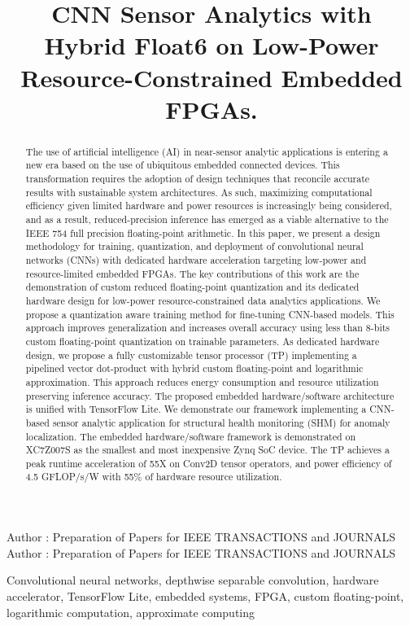 \title {CNN Sensor Analytics with Hybrid Float6 on Low-Power Resource-Constrained Embedded FPGAs.}



\markboth
{Author \headeretal: Preparation of Papers for IEEE TRANSACTIONS and JOURNALS}
{Author \headeretal: Preparation of Papers for IEEE TRANSACTIONS and JOURNALS}


\begin{abstract}
The use of artificial intelligence (AI) in near-sensor analytic applications is entering a new era based on the use of ubiquitous embedded connected devices. This transformation requires the adoption of design techniques that reconcile accurate results with sustainable system architectures. As such, maximizing computational efficiency given limited hardware and power resources is increasingly being considered, and as a result, reduced-precision inference has emerged as a viable alternative to the IEEE 754 full precision floating-point arithmetic. In this paper, we present a design methodology for training, quantization, and deployment of convolutional neural networks (CNNs) with dedicated hardware acceleration targeting low-power and resource-limited embedded FPGAs. The key contributions of this work are the demonstration of custom reduced floating-point quantization and its dedicated hardware design for low-power resource-constrained data analytics applications. We propose a quantization aware training method for fine-tuning CNN-based models. This approach improves generalization and increases overall accuracy using less than 8-bits custom floating-point quantization on trainable parameters. As dedicated hardware design, we propose a fully customizable tensor processor (TP) implementing a pipelined vector dot-product with hybrid custom floating-point and logarithmic approximation. This approach reduces energy consumption and resource utilization preserving inference accuracy. The proposed embedded hardware/software architecture is unified with TensorFlow Lite. We demonstrate our framework implementing a CNN-based sensor analytic application for structural health monitoring (SHM) for anomaly localization. The embedded hardware/software framework is demonstrated on XC7Z007S as the smallest and most inexpensive Zynq SoC device. The TP achieves a peak runtime acceleration of 55X on Conv2D tensor operators, and power efficiency of 4.5 GFLOP/s/W with 55\% of hardware resource utilization.
\end{abstract}

\begin{keywords}
Convolutional neural networks, depthwise separable convolution, hardware accelerator, TensorFlow Lite, embedded systems, FPGA, custom floating-point, logarithmic computation, approximate computing
\end{keywords}

\titlepgskip=-15pt

\maketitle
